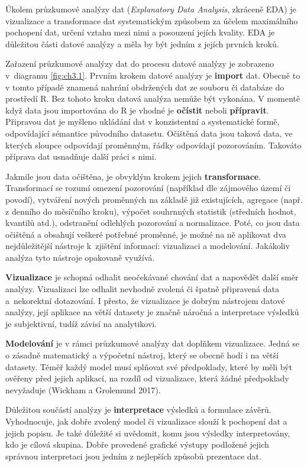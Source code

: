 \documentclass[12pt,]{article}
\begin{document}
\qquad Úkolem průzkumové analýzy dat (\emph{Explanatory Data Analysis},
zkráceně EDA) je vizualizace a transformace dat systematickým způsobem
za účelem maximálního pochopení dat, určení vztahu mezi nimi a posouzení
jejích kvality. EDA je důležitou části datové analýzy a měla by být
jedním z jejích prvních kroků.

\qquad Zařazení průzkumové analýzy dat do procesu datové analýzy je
zobrazeno v~diagramu \ref{fig:ch3.1}. Prvním krokem datové analýzy je
\textbf{import} dat. Obecně to v tomto případě znamená nahrání
obdržených dat ze souboru či databáze do prostředí R. Bez tohoto kroku
datová analýza nemůže být vykonána. V momentě když data jsou importována
do R je vhodné je \textbf{očístit} neboli \textbf{přípravit}. Připravou
dat je myšleno ukládání dat v konzistentní a systematické formě,
odpovídající sémantice původního datasetu. Očištěná data jsou taková
data, ve kterých sloupce odpovídají proměnným, řádky odpovídají
pozorováním. Takováto příprava dat usnadňuje další práci s nimi.

\qquad Jakmile jsou data očištěna, je obvyklým krokem jejich
\textbf{transformace}. Transformací se rozumí omezení pozorování
(například dle zájmového území či povodí), vytváření nových proměnných
na základě již existujících, agregace (např. z denního do měsíčního
kroku), výpočet souhrnných statistik (středních hodnot, kvantilů atd.),
odstranění odlehlých pozorování a normalizace. Poté, co jsou data
očištěná a obsahují veškeré potřebné proměnné, je možné na ně aplikovat
dva nejdůležitější nástroje k~zjištění informací: vizualizaci a
modelování. Jakákoliv analýza tyto nástroje opakovaně využívá.

\qquad \textbf{Vizualizace} je schopná odhalit neočekávané chování dat a
napovědět další směr analýzy. Vizualizaci lze odhalit nevhodně zvolená
či špatně připravená data a~nekorektní dotazování. I přesto, že
vizualizace je dobrým nástrojem datové analýzy, její aplikace na větší
datasety je značně náročná a interpretace výsledků je subjektivní, tudíž
závisí na analytikovi.

\qquad \textbf{Modelování} je v rámci průzkumové analýzy dat doplňkem
vizualizace. Jedná se o zásadně matematický a výpočetní nástroj, který
se obecně hodí i na větší datasety. Téměř každý model musí splňovat své
předpoklady, které by měli být ověřeny před jejich aplikací, na rozdíl
od vizualizace, která žádné předpoklady nevyžaduje (Wickham a Grolemund
2017).

\qquad Důležitou součástí analýzy je \textbf{interpretace} výsledků a
formulace závěrů. Vyhodnocuje, jak dobře zvolený model či vizualizace
slouží k pochopení dat a jejich popisu. Je také důležité si uvědomit,
komu jsou výsledky interpretovány, kdo je cílová skupina. Dobře
provedené grafické výstupy podložené jejich správnou interpretaci jsou
jedním z nejlepších způsobů prezentace dat.
\end{document}
